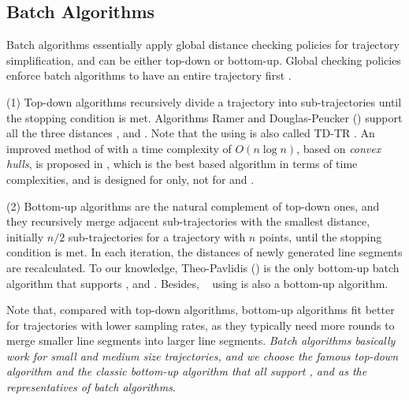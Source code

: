 \subsection{Batch Algorithms}
Batch algorithms essentially apply global distance checking policies for trajectory simplification, and can be either top-down or bottom-up.
Global checking policies enforce batch algorithms to have an entire trajectory first \cite{Meratnia:Spatiotemporal}.

(1) Top-down algorithms recursively divide a trajectory into sub-trajectories until the stopping condition is met.
Algorithms Ramer \cite{Ramer:Split} and Douglas-Peucker (\dpa)  \cite{Douglas:Peucker} support all the three distances \ped, \sed and \dad. {Note that  the \dpa using \sed is also called TD-TR \cite{Meratnia:Spatiotemporal}}.
An improved method of \dpa with a time complexity of $O(n\log n)$, based on \emph{convex hulls}, is proposed in \cite{Hershberger:Speeding}, which is the best \dpa based  algorithm in terms of time complexities, and is designed for \ped only, not for \sed and \dad.



(2) Bottom-up algorithms are the natural complement of top-down ones, and they recursively merge adjacent sub-trajectories with the smallest distance, initially $n/2$  sub-trajectories for a trajectory with $n$ points, until the stopping condition is met. In each iteration, the distances of newly generated line segments are recalculated.
To our knowledge, Theo-Pavlidis (\tpa) \cite{Pavlidis:Segment} is the only bottom-up batch \lsa algorithm that supports \ped, \sed and \dad. {Besides, \bumr~\cite{Chen:Fast} using \lissed is also a bottom-up algorithm.}

Note that, compared with top-down algorithms, bottom-up algorithms fit better for trajectories with lower sampling rates, as they typically need more rounds to merge smaller line segments into larger line segments. {\em Batch algorithms basically work for small and medium size trajectories, and we choose {the famous top-down algorithm} \dpa and {the classic bottom-up algorithm} \tpa that all support \ped, \sed and \dad  as the representatives of batch \lsa algorithms}.


